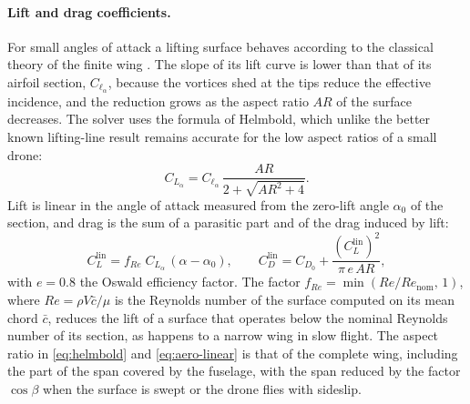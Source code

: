 \paragraph{Lift and drag coefficients.} For small angles of attack a lifting surface behaves according to the classical theory of the finite wing \cite{anderson2017fundamentals}. The slope of its lift curve is lower than that of its airfoil section, $C_{\ell_\alpha}$, because the vortices shed at the tips reduce the effective incidence, and the reduction grows as the aspect ratio $\mathit{AR}$ of the surface decreases. The solver uses the formula of Helmbold, which unlike the better known lifting-line result remains accurate for the low aspect ratios of a small drone:
\begin{equation}
C_{L_\alpha} = C_{\ell_\alpha}\, \frac{\mathit{AR}}{2 + \sqrt{\mathit{AR}^2 + 4}} .
\label{eq:helmbold}
\end{equation}
Lift is linear in the angle of attack measured from the zero-lift angle $\alpha_0$ of the section, and drag is the sum of a parasitic part and of the drag induced by lift:
\begin{equation}
C_L^{\mathrm{lin}} = f_{\mathit{Re}}\; C_{L_\alpha}\,(\alpha - \alpha_0), \qquad
C_D^{\mathrm{lin}} = C_{D_0} + \frac{\left(C_L^{\mathrm{lin}}\right)^2}{\pi\, e\, \mathit{AR}},
\label{eq:aero-linear}
\end{equation}
with $e = 0.8$ the Oswald efficiency factor. The factor $f_{\mathit{Re}} = \min(\mathit{Re}/\mathit{Re}_{\mathrm{nom}},\, 1)$, where $\mathit{Re} = \rho V \bar c/\mu$ is the Reynolds number of the surface computed on its mean chord $\bar c$, reduces the lift of a surface that operates below the nominal Reynolds number of its section, as happens to a narrow wing in slow flight. The aspect ratio in \eqref{eq:helmbold} and \eqref{eq:aero-linear} is that of the complete wing, including the part of the span covered by the fuselage, with the span reduced by the factor $\cos\beta$ when the surface is swept or the drone flies with sideslip.

